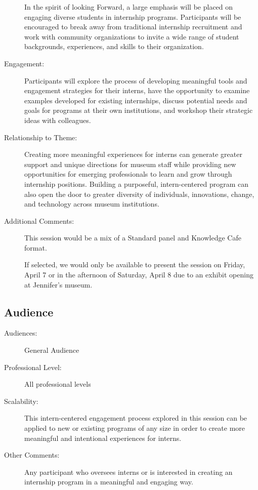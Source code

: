 \documentclass{report}
\begin{document}
\begin{description}
In the spirit of looking Forward, a large emphasis will be placed on engaging diverse students in internship programs. Participants will be encouraged to break away from traditional internship recruitment and work with community organizations to invite a wide range of student backgrounds, experiences, and skills to their organization.
							    \item [Engagement:]Participants will explore the process of developing meaningful tools and engagement strategies for their interns, have the opportunity to examine examples developed for existing internships, discuss potential needs and goals for programs at their own institutions, and workshop their strategic ideas with colleagues.
							    \item [Relationship to Theme:]Creating more meaningful experiences for interns can generate greater support and unique directions for museum staff while providing new opportunities for emerging professionals to learn and grow through internship positions. Building a purposeful, intern-centered program can also open the door to greater diversity of individuals, innovations, change, and technology across museum institutions.
							    
                    \item [Additional Comments: ]This session would be a mix of a Standard panel and Knowledge Cafe format.

If selected, we would only be available to present the session on Friday, April 7 or in the afternoon of Saturday, April 8 due to an exhibit opening at Jennifer’s museum.

                \end{description}
              \subsection*{Audience}
                \begin{description}
                  \item [Audiences:]General Audience~
                  \item[Professional Level:]All professional levels~
                \item[Scalability:] This intern-centered engagement process explored in this session can be applied to new or existing programs of any size in order to create more meaningful and intentional experiences for interns.

							
              \item[Other Comments:] Any participant who oversees interns or is interested in creating an internship program in a meaningful and engaging way.
              \end{description}
\end{document}
